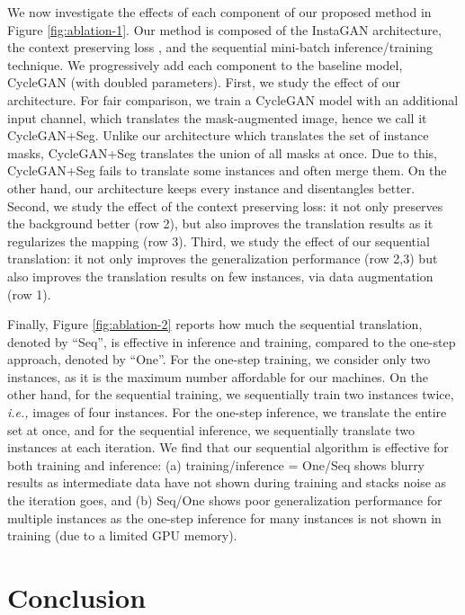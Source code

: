 \documentclass{article} \usepackage{iclr2019_conference,times}
\begin{document}
We now investigate the effects of each component of our proposed method in Figure \ref{fig:ablation-1}.
Our method is composed of the InstaGAN architecture, the context preserving loss ,
and the sequential mini-batch inference/training technique.
We progressively add each component to the baseline model, CycleGAN (with doubled parameters).
First, we study the effect of our architecture.
For fair comparison, we train a CycleGAN model with an additional input channel,
which translates the mask-augmented image, hence we call it CycleGAN+Seg.
Unlike our architecture which translates the set of instance masks,
CycleGAN+Seg translates the union of all masks at once.
Due to this, CycleGAN+Seg fails to translate some instances and often merge them.
On the other hand, our architecture keeps every instance and disentangles better.
Second, we study the effect of the context preserving loss: it not only preserves the background better (row 2),
but also improves the translation results as it regularizes the mapping (row 3).
Third, we study the effect of our sequential translation:
it not only improves the generalization performance (row 2,3)
but also improves the translation results on few instances, via data augmentation (row 1).

Finally, Figure \ref{fig:ablation-2} reports how much the sequential translation,
denoted by ``Seq'', is effective in inference and training, compared to the one-step approach, denoted by ``One''.
For the one-step training,
we consider only two instances, as it is the maximum number affordable for our machines.
On the other hand, for the sequential training,  we sequentially train two instances twice, \textit{i.e.,} images of four instances.
For the one-step inference, we translate the entire set at once,
and for the sequential inference, we sequentially translate two instances at each iteration.
We find that our sequential algorithm is effective for both training and inference:
(a) training/inference = One/Seq shows blurry results as intermediate data have not shown during training and stacks noise as the iteration goes,
and (b) Seq/One shows poor generalization performance for multiple instances as
the one-step inference for many instances is not shown in training (due to a limited GPU memory).

 \vspace{-0.05in}
\section{Conclusion}
\vspace{-0.05in}
\end{document}
